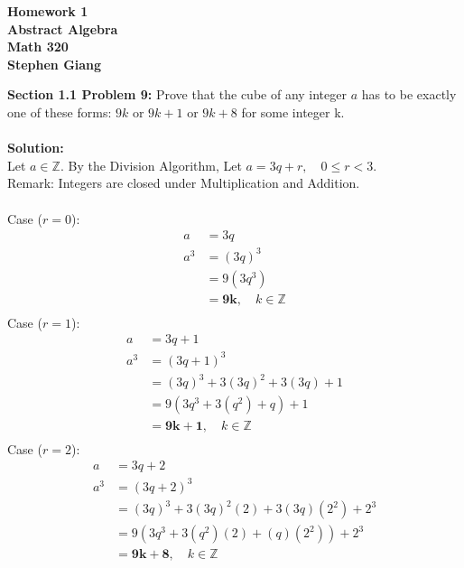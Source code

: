 \documentclass[12pt]{article}
\begin{document}
	
	\begin{center}
		\textbf{Homework 1} \\
		\textbf{Abstract Algebra} \\
		\textbf{Math 320} \\
		\textbf{Stephen Giang} \\
	\end{center}

\noindent \textbf{Section 1.1 Problem 9: }
Prove that the cube of any integer $a$ has to be exactly one of these forms: $9k$ or $9k + 1$ or $9k + 8$ for some integer k.
\\\\
\textbf{Solution: } \\
Let $a \in \mathbb{Z}$.  By the Division Algorithm, Let $a = 3q + r, \quad 0  \leq r < 3$. \\Remark: Integers are closed under Multiplication and Addition. \\\\
Case ($r = 0$): \\
	\begin{align}
		a &= 3q \\
		a^3 &= (3q)^3 \\
		&= 9(3q^3) \\
		&= \boldsymbol{9k}, \quad \text{$k \in \mathbb{Z}$}\\
	\end{align}
Case ($r = 1$): \\
	\begin{align}
		a &= 3q + 1 \\
		a^3 &= (3q+1)^3 \\
		&= (3q)^3 + 3 (3q)^2 + 3 (3q) + 1 \\
		&= 9(3 q^3 + 3 (q^2) + q) + 1 \\
		&= \boldsymbol{9k + 1}, \quad \text{$k \in \mathbb{Z}$}\\
	\end{align}	
Case ($r = 2$): \\
	\begin{align}
		a &= 3q + 2 \\
		a^3 &= (3q+2)^3 \\
		&= (3q)^3 + 3 (3q)^2(2) + 3 (3q)(2^2) + 2^3 \\
		&= 9(3q^3 + 3 (q^2)(2) + (q)(2^2)) + 2^3 \\
		&= \boldsymbol{9k + 8}, \quad \text{$k \in \mathbb{Z}$}\\
	\end{align}	
	
\end{document}
